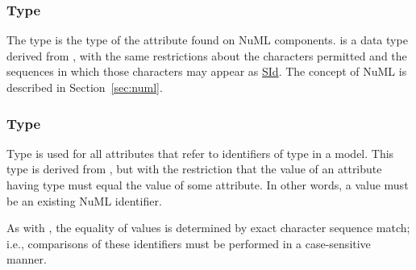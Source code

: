 \subsubsection[\element{NuMLSId}]{Type }
\label{type:numlsid}
The type  is the type of the  attribute found on NuML components.  is a data type derived from \SId, with the same restrictions about the characters permitted and the sequences in which those characters may appear as \hyperref[type:sid]{SId}. The concept of NuML is described in Section~\ref{sec:numl}.

\subsubsection[\element{NuMLSIdRef}]{Type }
\label{type:numlsidref}
Type  is used for all attributes that refer to identifiers of type \hyperref[type:numlsid]{} in a model. This type is derived from \hyperref[type:numlsid]{}, but with the restriction that the value of an attribute having type  must equal the value of some \hyperref[type:numlsid]{} attribute. In other words, a  value must be an existing NuML identifier.

As with \hyperref[type:numlsid]{}, the equality of  values is determined by exact character sequence match; i.e., comparisons of these identifiers must be performed in a case-sensitive manner.

